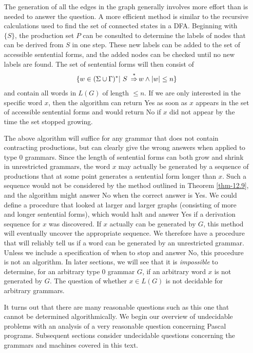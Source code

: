 The generation of all the edges in the graph generally involves more effort
than is needed to answer the question. A more efficient method is similar to
the recursive calculations used to find the set of connected states in a DFA.
Beginning with $\{S\}$, the production set $P$ can be consulted to determine the
labels of nodes that can be derived from $S$ in one step. These new labels can
be added to the set of accessible sentential forms, and the added nodes can be
checked until no new labels are found. The set of sentential forms will then 
consist of
\[ \{w\in(\Sigma\cup\Gamma)^*|\ S\ \operatorname{\overset{*}{\Rightarrow}} w \wedge |w|\leq n\} \]
and contain all words in $L(G)$ of length $\leq n$. If we are only interested in
the specific word $x$, then the algorithm can return Yes as soon as $x$ appears
in the set of accessible sentential forms and would return No if $x$ did not
appear by the time the set stopped growing.

The above algorithm will suffice for any grammar that does not contain
contracting productions, but can clearly give the wrong answers when applied to
type 0 grammars. Since the length of sentential forms can both grow and shrink
in unrestricted grammars, the word $x$ may actually be generated by a sequence
of productions that at some point generates a sentential form longer than $x$.
Such a sequence would not be considered by the method outlined in Theorem
\ref{thm-12.9}, and the algorithm might answer No when the correct answer is Yes.
We could define a procedure that looked at larger and larger graphs (consisting
of more and longer sentential forms), which would halt and answer Yes if a
derivation sequence for $x$ was discovered. If $x$ actually can be generated by
$G$, this method will eventually uncover the appropriate sequence. We therefore
have a procedure that will reliably tell us if a word can be generated by an
unrestricted grammar. Unless we include a specification of when to stop and
answer No, this procedure is not an algorithm. In later sections, we will see
that it is \emph{impossible} to determine, for an arbitrary type 0 grammar $G$,
if an arbitrary word $x$ is not generated by $G$. The question of whether $x\in
L(G)$ is not decidable for arbitrary grammars.

It turns out that there are many reasonable questions such as this one that
cannot be determined algorithmically. We begin our overview of undecidable
problems with an analysis of a very reasonable question concerning Pascal
programs. Subsequent sections consider undecidable questions concerning the
grammars and machines covered in this text.


